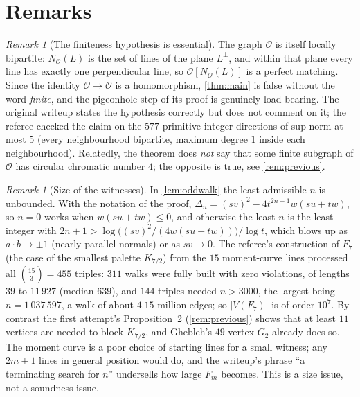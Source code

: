 \documentclass[11pt,a4paper]{article}
\theoremstyle{plain}
\theoremstyle{definition}
\theoremstyle{remark}
\newtheorem{remark}[theorem]{Remark}
\newcommand{\cO}{\mathcal O}
\newcommand{\Kc}[2]{K_{#1/#2}}
\newcommand{\Nb}{N_{\cO}}
\newcommand{\Fin}[1]{F_{#1}}
\begin{document}
\section{Remarks}

\begin{remark}[The finiteness hypothesis is essential]\label{rem:finite}
The graph $\cO$ is itself locally bipartite: $\Nb(L)$ is the set of lines of the plane $L^\perp$, and within that plane every line has exactly one perpendicular line, so $\cO[\Nb(L)]$ is a perfect matching. Since the identity $\cO\to\cO$ is a homomorphism, \cref{thm:main} is false without the word \emph{finite}, and the pigeonhole step of its proof is genuinely load-bearing. The original writeup states the hypothesis correctly but does not comment on it; the referee checked the claim on the $577$ primitive integer directions of sup-norm at most $5$ (every neighbourhood bipartite, maximum degree $1$ inside each neighbourhood). Relatedly, the theorem does \emph{not} say that some finite subgraph of $\cO$ has circular chromatic number $4$; the opposite is true, see \cref{rem:previous}.
\end{remark}

\begin{remark}[Size of the witnesses]\label{rem:size}
In \cref{lem:oddwalk} the least admissible $n$ is unbounded. With the notation of the proof, $\Delta_n=(sv)^2-4t^{2n+1}w(su+tw)$, so $n=0$ works when $w(su+tw)\le0$, and otherwise the least $n$ is the least integer with $2n+1>\log\bigl((sv)^2/(4w(su+tw))\bigr)/\log t$, which blows up as $a\cdot b\to\pm1$ (nearly parallel normals) or as $sv\to0$. The referee's construction of $\Fin 7$ (the case of the smallest palette $\Kc72$) from the $15$ moment-curve lines processed all $\binom{15}{3}=455$ triples: $311$ walks were fully built with zero violations, of lengths $39$ to $11\,927$ (median $639$), and $144$ triples needed $n>3000$, the largest being $n=1\,037\,597$, a walk of about $4.15$ million edges; so $|V(\Fin 7)|$ is of order $10^7$. By contrast the first attempt's Proposition~2 (\cref{rem:previous}) shows that at least $11$ vertices are needed to block $\Kc72$, and Ghebleh's $49$-vertex $G_2$ already does so. The moment curve is a poor choice of starting lines for a small witness; any $2m+1$ lines in general position would do, and the writeup's phrase ``a terminating search for $n$'' undersells how large $\Fin m$ becomes. This is a size issue, not a soundness issue.
\end{remark}
\end{document}
